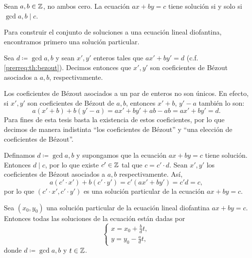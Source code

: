 \begin{theorem}[Existencia]
	\label{prerreq:th:existence}
	Sean $a, b \in \mathbb{Z}$, no ambos cero. La ecuación $ax + by = c$ tiene solución si y solo si
	$\gcd{a, b} \mid c$.
\end{theorem}

Para construir el conjunto de soluciones a una ecuación lineal diofantina, encontramos primero una
solución particular.
\begin{definition}
	\label{prerreq:def:bezout}
	Sea $d \coloneq \gcd{a, b}$ y sean $x', y'$ enteros tales que $ax' + by' = d$ (c.f.
	\ref{prerreq:th:bezout}). Decimos entonces que $x', y'$ son coeficientes de Bézout asociados a
	$a, b$, respectivamente.
\end{definition}

\begin{observation}
	Los coeficientes de Bézout asociados a un par de enteros no son únicos. En efecto, si $x', y'$
	son coeficientes de Bézout de $a, b$, entonces $x' + b$, $y' - a$ también lo son:
	\begin{equation*}
		a(x' + b) + b(y' - a) = ax' + by' + ab - ab = ax' + by' = d.
	\end{equation*}
	Para fines de esta tesis basta la existencia de estos coeficientes, por lo que decimos de manera
	indistinta ``los coeficientes de Bézout'' y ``una elección de coeficientes de Bézout''.
\end{observation}

Definamos $d \coloneq \gcd{a, b}$ y supongamos que la ecuación $ax + by = c$ tiene solución.
Entonces $d \mid c$, por lo que existe $c' \in \mathbb{Z}$ tal que $c = c' \cdot d$. Sean $x', y'$ los
coeficientes de Bézout asociados a $a, b$ respectivamente. Así,
\begin{equation*}
	a(c' \cdot x') + b(c' \cdot y') = c'(ax' + by') = c'd = c,
\end{equation*}
por lo que $(c' \cdot x', c' \cdot y')$ es una solución particular de la ecuación $ax + by = c$.

\begin{theorem}[Construcción]
	\label{prerreq:th:construction}
	Sea $(x_0, y_0)$ una solución particular de la ecuación lineal diofantina $ax + by = c$.
	Entonces todas las soluciones de la ecuación están dadas por
	\begin{equation}
		\label{prerreq:eq:construction}
		\begin{cases}
			x = x_0 + \frac{b}{d}t, \\
			y = y_0 - \frac{a}{d}t,
		\end{cases}
	\end{equation}
	donde $d \coloneq \gcd{a, b}$ y $t \in \mathbb{Z}$.
\end{theorem}

